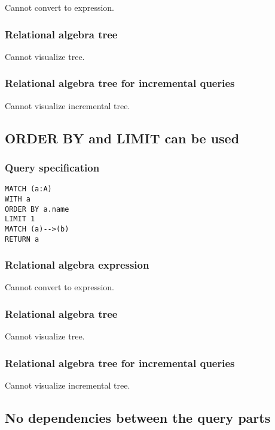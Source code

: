 Cannot convert to expression.

\subsubsection*{Relational algebra tree}

Cannot visualize tree.

\subsubsection*{Relational algebra tree for incremental queries}

Cannot visualize incremental tree.

\subsection{ORDER BY and LIMIT can be used}

\subsubsection*{Query specification}

\begin{lstlisting}
MATCH (a:A)
WITH a
ORDER BY a.name
LIMIT 1
MATCH (a)-->(b)
RETURN a
\end{lstlisting}

\subsubsection*{Relational algebra expression}

Cannot convert to expression.

\subsubsection*{Relational algebra tree}

Cannot visualize tree.

\subsubsection*{Relational algebra tree for incremental queries}

Cannot visualize incremental tree.

\subsection{No dependencies between the query parts}

